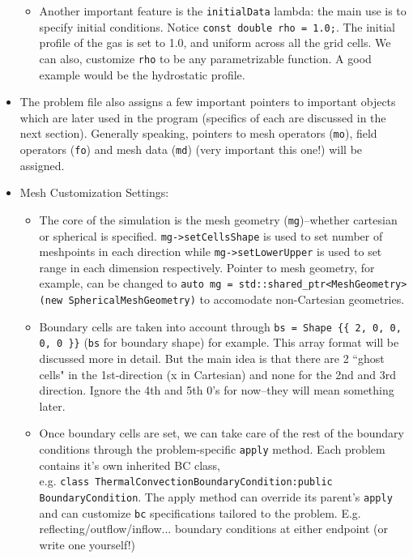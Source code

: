 \documentclass{article}
\begin{document}
\begin{itemize}
\begin{itemize}
		\item Another important feature is the \texttt{initialData} lambda: the main use is to specify initial conditions. Notice \texttt{const double rho = 1.0;}. The initial profile of the gas is set to 1.0, and uniform across all the grid cells. We can also, customize \texttt{rho} to be any parametrizable function. A good example would be the hydrostatic profile. 
	\end{itemize}		
	
	
	\item The problem file also assigns a few important pointers to important objects which are later used in the program (specifics of each are discussed in the next section). Generally speaking, pointers to mesh operators (\texttt{mo}), field operators (\texttt{fo}) and mesh data (\texttt{md}) (very important this one!) will be assigned.
	
	\item Mesh Customization Settings:
	\begin{itemize}	
		\item The core of the simulation is the mesh geometry (\texttt{mg})--whether cartesian or spherical is specified. \texttt{mg->setCellsShape} is used to set number of meshpoints in each direction while \texttt{mg->setLowerUpper} is used to set range in each dimension respectively. Pointer to mesh geometry, for example, can be changed to \texttt{auto mg = std::shared\_ptr<MeshGeometry> (new SphericalMeshGeometry)} to accomodate non-Cartesian geometries.
		
		\item Boundary cells are taken into account through \texttt{bs = Shape \{\{ 2, 0, 0, 0, 0 \}\}} (\texttt{bs} for boundary shape) for example. This array format will be discussed more in detail. But the main idea is that there are 2 ``ghost cells" in the 1st-direction (x in Cartesian) and none for the 2nd and 3rd direction. Ignore the 4th and 5th 0's for now--they will mean something later. 
		
		\item Once boundary cells are set, we can take care of the rest of the boundary conditions through the problem-specific \texttt{apply} method. Each problem contains it's own inherited BC class, \\
	e.g. \texttt{class ThermalConvectionBoundaryCondition:public BoundaryCondition}. The apply method can override its parent's \texttt{apply} and can customize \texttt{bc} specifications tailored to the problem. E.g. reflecting/outflow/inflow... boundary conditions at either endpoint (or write one yourself!)   
		

\end{itemize}
\end{itemize}
\end{document}
